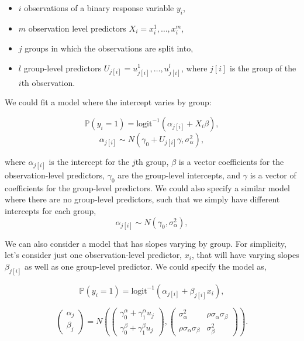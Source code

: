 \documentclass[12pt,twoside]{reedthesis}
\providecommand{\tightlist}{%
  \setlength{\itemsep}{0pt}\setlength{\parskip}{0pt}}
\begin{document}
  \begin{itemize}
  \tightlist
  \item
    \(i\) observations of a binary response variable \(y_i\),
  \item
    \(m\) observation level predictors \(X_i = x_i^1, \ldots, x_i^m\),
  \item
    \(j\) groups in which the observations are split into,
  \item
    \(l\) group-level predictors
    \(U_{j[i]} = u_{j[i]}^1, \ldots, u_{j[i]}^l\), where \(j[i]\) is the
    group of the \(i\)th observation.
  \end{itemize}
  
  We could fit a model where the intercept varies by group:
  
  \[\mathbb{P} (y_i = 1) = \text{logit}^{-1}
  (\alpha_{j[i]} + X_i \beta),\]
  \[\alpha_{j[i]} \sim N(\gamma_0 + U_{j[i]} \gamma, \sigma_{\alpha}^2),\]
  
  where \(\alpha_{j[i]}\) is the intercept for the \(j\)th group,
  \(\beta\) is a vector coefficients for the observation-level predictors,
  \(\gamma_0\) are the group-level intercepts, and \(\gamma\) is a vector
  of coefficients for the group-level predictors. We could also specify a
  similar model where there are no group-level predictors, such that we
  simply have different intercepts for each group,
  \[\alpha_{j[i]} \sim N(\gamma_0, \sigma_{\alpha}^2),\]
  
  We can also consider a model that has slopes varying by group. For
  simplicity, let's consider just one observation-level predictor,
  \(x_i\), that will have varying slopes \(\beta_{j[i]}\) as well as one
  group-level predictor. We could specify the model as,
  
  \[\mathbb{P} (y_i = 1) = \text{logit}^{-1}
  (\alpha_{j[i]} + \beta_{j[i]} x_i),\]
  
  \[
  \left(
  \begin{array}{c}
  \alpha_{j}\\
  \beta_{j}
  \end{array}
  \right) =
  N \left(
  \left(
  \begin{array}{c}
  \gamma_0^\alpha + \gamma_1^\alpha u_j\\
  \gamma_0^\beta + \gamma_1^\beta u_j
  \end{array}
  \right),
  \left(
  \begin{array}{cc}
  \sigma^2_\alpha & \rho \sigma_\alpha \sigma_\beta\\
  \rho \sigma_\alpha \sigma_\beta & \sigma^2_\beta
  \end{array}
  \right)
  \right).
  \]
  
\end{document}
